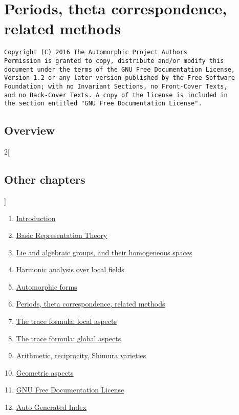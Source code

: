 \documentclass[oneside]{stacks-project-book}
\theoremstyle{plain}
\theoremstyle{definition}
\theoremstyle{remark}
\numberwithin{equation}{subsection}
\begin{document}
%

\chapter{Periods, theta correspondence, related methods}



\label{periods-section-phantom}
\hypertarget{0500}{}
\reversemarginpar{}

\begin{verbatim}
Copyright (C) 2016 The Automorphic Project Authors
Permission is granted to copy, distribute and/or modify this
document under the terms of the GNU Free Documentation License,
Version 1.2 or any later version published by the Free Software
Foundation; with no Invariant Sections, no Front-Cover Texts,
and no Back-Cover Texts. A copy of the license is included in
the section entitled "GNU Free Documentation License".
\end{verbatim}



\section{Overview}
\label{periods-section-overview}
\hypertarget{0501}{}
\reversemarginpar{}




\begin{multicols}{2}[\section{Other chapters}]
\noindent
\begin{enumerate}
\item \hyperref[introduction-section-phantom]{Introduction}
\item \hyperref[representationtheory-section-phantom]{Basic Representation Theory}
\item \hyperref[algebraicgroups-section-phantom]{Lie and algebraic groups, and their homogeneous spaces}
\item \hyperref[harmonicanalysis-section-phantom]{Harmonic analysis over local fields}
\item \hyperref[automorphicforms-section-phantom]{Automorphic forms}
\item \hyperref[periods-section-phantom]{Periods, theta correspondence, related methods}
\item \hyperref[traceformulalocal-section-phantom]{The trace formula: local aspects}
\item \hyperref[traceformulaglobal-section-phantom]{The trace formula: global aspects}
\item \hyperref[arithmetic-section-phantom]{Arithmetic, reciprocity, Shimura varieties}
\item \hyperref[geometric-section-phantom]{Geometric aspects}
\item \hyperref[fdl-section-phantom]{GNU Free Documentation License}
\item \hyperref[index-section-phantom]{Auto Generated Index}
\end{enumerate}
\end{multicols}
\end{document}
